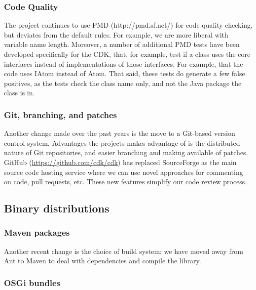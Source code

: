 \documentclass[10pt]{bmcart}
\begin{document}
  \subsubsection*{Code Quality}

The project continues to use PMD (http://pmd.sf.net/) for code quality checking,
but deviates from the default rules. For example, we are more liberal with 
variable name length. Moreover, a number of additional PMD tests have been
developed specifically for the CDK, that, for example, test if a class uses
the core interfaces instead of implementations of those interfaces. For example,
that the code uses IAtom instead of Atom. That said, these tests do generate a
few false positives, as the tests check the class name only, and not the
Java package the class is in.

  \subsubsection*{Git, branching, and patches}

Another change made over the past years is the move to a Git-based version
control system. Advantages the projects makes advantage of is the distributed
nature of Git repositories, and easier branching and making available of
patches. GitHub (\url{https://github.com/cdk/cdk}) has replaced SourceForge
as the main source code hosting service
where we can use novel approaches for commenting on code, pull requests, etc.
These new features simplify our code review process.

\subsection*{Binary distributions}

\subsubsection*{Maven packages}

Another recent change is the choice of build system: we have moved away from
Ant to Maven to deal with dependencies and compile the library. 


\subsubsection*{OSGi bundles}
\end{document}
